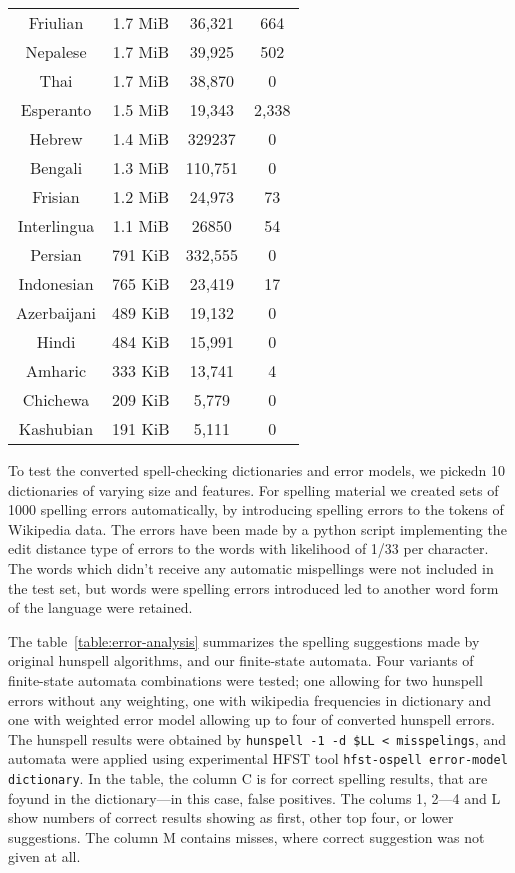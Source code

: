 \documentclass[a4paper,runningheads]{llncs}
\begin{document}
\begin{table}[tbp]
\begin{tabular}{cccc}
    Friulian & 1.7 MiB & 36,321 & 664 \\
    Nepalese & 1.7 MiB & 39,925 & 502 \\
    Thai & 1.7 MiB & 38,870 & 0 \\
    Esperanto & 1.5 MiB & 19,343 & 2,338 \\
    Hebrew & 1.4 MiB & 329237 & 0 \\
    Bengali & 1.3 MiB & 110,751 & 0 \\
    Frisian& 1.2 MiB & 24,973 & 73 \\
    Interlingua & 1.1 MiB & 26850 & 54 \\
    Persian & 791 KiB & 332,555 & 0 \\
    Indonesian & 765 KiB & 23,419 & 17 \\
    Azerbaijani & 489 KiB & 19,132 & 0 \\
    Hindi & 484 KiB & 15,991 & 0 \\
    Amharic & 333 KiB & 13,741 & 4 \\
    Chichewa & 209 KiB & 5,779 & 0 \\
    Kashubian & 191 KiB & 5,111 & 0 \\
    \hline
  \end{tabular}
\end{table}

To test the converted spell-checking dictionaries and error models, we pickedn
10 dictionaries of varying size and features. For spelling material we
created sets of 1000 spelling errors automatically, by introducing spelling
errors to the tokens of Wikipedia data. The errors have been made by a python
script implementing the edit distance type of errors to the words with 
likelihood of 1/33 per character. The words which didn't receive any automatic
mispellings were not included in the test set, but words were spelling errors
introduced led to another word form of the language were retained. 

The table~\ref{table:error-analysis} summarizes the spelling suggestions made
by original hunspell algorithms, and our finite-state automata. Four variants
of finite-state automata combinations were tested; one allowing for two
hunspell errors without any weighting, one with wikipedia frequencies in
dictionary and one with weighted error model allowing up to four of converted
hunspell errors.  The hunspell results were obtained by \texttt{hunspell -1 -d
\$LL < misspelings}, and automata were applied using experimental HFST tool
\texttt{hfst-ospell error-model dictionary}. In the table, the column C is for
correct spelling results, that are foyund in the dictionary---in this case,
false positives.  The colums 1, 2---4 and L show numbers of correct results
showing as first, other top four, or lower suggestions. The column M contains
misses, where correct suggestion was not given at all.
\end{document}
